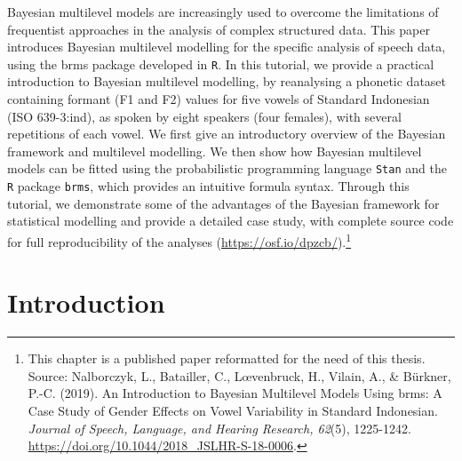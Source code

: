 \documentclass[a4paper,12pt,twoside,openright,oldfontcommands,final]{memoir}
\let\rmarkdownfootnote\footnote%
\def\footnote{\protect\rmarkdownfootnote}
\begin{document}
Bayesian multilevel models are increasingly used to overcome the limitations of frequentist approaches in the analysis of complex structured data. This paper introduces Bayesian multilevel modelling for the specific analysis of speech data, using the brms package developed in \texttt{R}. In this tutorial, we provide a practical introduction to Bayesian multilevel modelling, by reanalysing a phonetic dataset containing formant (F1 and F2) values for five vowels of Standard Indonesian (ISO 639-3:ind), as spoken by eight speakers (four females), with several repetitions of each vowel. We first give an introductory overview of the Bayesian framework and multilevel modelling. We then show how Bayesian multilevel models can be fitted using the probabilistic programming language \texttt{Stan} and the \texttt{R} package \texttt{brms}, which provides an intuitive formula syntax. Through this tutorial, we demonstrate some of the advantages of the Bayesian framework for statistical modelling and provide a detailed case study, with complete source code for full reproducibility of the analyses (\url{https://osf.io/dpzcb/}).\footnote{This chapter is a published paper reformatted for the need of this thesis. Source: Nalborczyk, L., Batailler, C., L\oe venbruck, H., Vilain, A., \& Bürkner, P.-C. (2019). An Introduction to Bayesian Multilevel Models Using brms: A Case Study of Gender Effects on Vowel Variability in Standard Indonesian. \emph{Journal of Speech, Language, and Hearing Research, 62}(5), 1225-1242. \url{https://doi.org/10.1044/2018_JSLHR-S-18-0006}.}

\hypertarget{introduction-5}{%
\section{Introduction}\label{introduction-5}}
\end{document}
